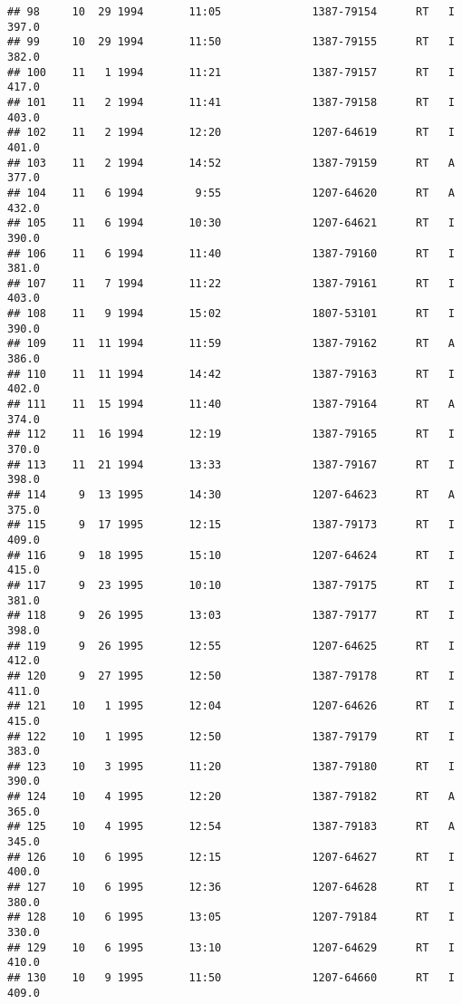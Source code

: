 \documentclass[
]{article}
\begin{document}
\begin{verbatim}
## 98     10  29 1994       11:05              1387-79154      RT   I     397.0
## 99     10  29 1994       11:50              1387-79155      RT   I     382.0
## 100    11   1 1994       11:21              1387-79157      RT   I     417.0
## 101    11   2 1994       11:41              1387-79158      RT   I     403.0
## 102    11   2 1994       12:20              1207-64619      RT   I     401.0
## 103    11   2 1994       14:52              1387-79159      RT   A     377.0
## 104    11   6 1994        9:55              1207-64620      RT   A     432.0
## 105    11   6 1994       10:30              1207-64621      RT   I     390.0
## 106    11   6 1994       11:40              1387-79160      RT   I     381.0
## 107    11   7 1994       11:22              1387-79161      RT   I     403.0
## 108    11   9 1994       15:02              1807-53101      RT   I     390.0
## 109    11  11 1994       11:59              1387-79162      RT   A     386.0
## 110    11  11 1994       14:42              1387-79163      RT   I     402.0
## 111    11  15 1994       11:40              1387-79164      RT   A     374.0
## 112    11  16 1994       12:19              1387-79165      RT   I     370.0
## 113    11  21 1994       13:33              1387-79167      RT   I     398.0
## 114     9  13 1995       14:30              1207-64623      RT   A     375.0
## 115     9  17 1995       12:15              1387-79173      RT   I     409.0
## 116     9  18 1995       15:10              1207-64624      RT   I     415.0
## 117     9  23 1995       10:10              1387-79175      RT   I     381.0
## 118     9  26 1995       13:03              1387-79177      RT   I     398.0
## 119     9  26 1995       12:55              1207-64625      RT   I     412.0
## 120     9  27 1995       12:50              1387-79178      RT   I     411.0
## 121    10   1 1995       12:04              1207-64626      RT   I     415.0
## 122    10   1 1995       12:50              1387-79179      RT   I     383.0
## 123    10   3 1995       11:20              1387-79180      RT   I     390.0
## 124    10   4 1995       12:20              1387-79182      RT   A     365.0
## 125    10   4 1995       12:54              1387-79183      RT   A     345.0
## 126    10   6 1995       12:15              1207-64627      RT   I     400.0
## 127    10   6 1995       12:36              1207-64628      RT   I     380.0
## 128    10   6 1995       13:05              1207-79184      RT   I     330.0
## 129    10   6 1995       13:10              1207-64629      RT   I     410.0
## 130    10   9 1995       11:50              1207-64660      RT   I     409.0

\end{verbatim}
\end{document}
